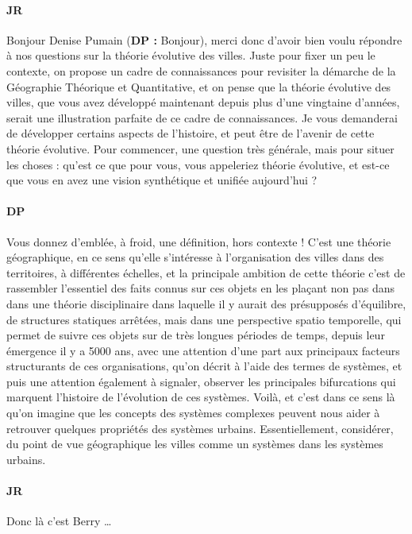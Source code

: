 



\paragraph{JR}

Bonjour Denise Pumain (\textbf{DP : } Bonjour), merci donc d'avoir bien voulu répondre à nos questions sur la théorie évolutive des villes. Juste pour fixer un peu le contexte, on propose un cadre de connaissances pour revisiter la démarche de la Géographie Théorique et Quantitative, et on pense que la théorie évolutive des villes, que vous avez développé maintenant depuis plus d'une vingtaine d'années, serait une illustration parfaite de ce cadre de connaissances. Je vous demanderai de développer certains aspects de l'histoire, et peut être de l'avenir de cette théorie évolutive. Pour commencer, une question très générale, mais pour situer les choses : qu'est ce que pour vous, vous appeleriez théorie évolutive, et est-ce que vous en avez une vision synthétique et unifiée aujourd'hui ?


\paragraph{DP}

Vous donnez d'emblée, à froid, une définition, hors contexte ! C'est une théorie géographique, en ce sens qu'elle s'intéresse à l'organisation des villes dans des territoires, à différentes échelles, et la principale ambition de cette théorie c'est de rassembler l'essentiel des faits connus sur ces objets en les plaçant non pas dans dans une théorie disciplinaire dans laquelle il y aurait des présupposés d'équilibre, de structures statiques arrêtées, mais dans une perspective spatio temporelle, qui permet de suivre ces objets sur de très longues périodes de temps, depuis leur émergence il y a 5000 ans, avec une attention d'une part aux principaux facteurs structurants de ces organisations, qu'on décrit à l'aide des termes de systèmes, et puis une attention également à signaler, observer les principales bifurcations qui marquent l'histoire de l'évolution de ces systèmes. Voilà, et c'est dans ce sens là qu'on imagine que les concepts des systèmes complexes peuvent nous aider à retrouver quelques propriétés des systèmes urbains. Essentiellement, considérer, du point de vue géographique les villes comme un systèmes dans les systèmes urbains.

\paragraph{JR} Donc là c'est Berry \ldots

